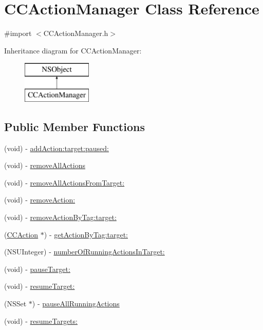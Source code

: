 \hypertarget{interface_c_c_action_manager}{\section{C\-C\-Action\-Manager Class Reference}
\label{interface_c_c_action_manager}
}


{\ttfamily \#import $<$C\-C\-Action\-Manager.\-h$>$}

Inheritance diagram for C\-C\-Action\-Manager\-:\begin{figure}[H]
\begin{center}
\leavevmode
\includegraphics[height=2.000000cm]{interface_c_c_action_manager}
\end{center}
\end{figure}
\subsection*{Public Member Functions}
\begin{DoxyCompactItemize}
\item 
(void) -\/ \hyperlink{interface_c_c_action_manager_acaa9759ef06e75a48d82e01b673f2eb4}{add\-Action\-:target\-:paused\-:}
\item 
(void) -\/ \hyperlink{interface_c_c_action_manager_a221135cfd89d31e862e2a2b8cbd3b0ff}{remove\-All\-Actions}
\item 
(void) -\/ \hyperlink{interface_c_c_action_manager_af32c4dcefa469ecece2541d0f405b517}{remove\-All\-Actions\-From\-Target\-:}
\item 
(void) -\/ \hyperlink{interface_c_c_action_manager_a6f10c668c171f7858b9202c1be97db40}{remove\-Action\-:}
\item 
(void) -\/ \hyperlink{interface_c_c_action_manager_a98c01e9ff6ad3db964d13c0daec8eb8c}{remove\-Action\-By\-Tag\-:target\-:}
\item 
(\hyperlink{interface_c_c_action}{C\-C\-Action} $\ast$) -\/ \hyperlink{interface_c_c_action_manager_afb80f2cb77931d02b00f1c53a23b717a}{get\-Action\-By\-Tag\-:target\-:}
\item 
(N\-S\-U\-Integer) -\/ \hyperlink{interface_c_c_action_manager_a4961d5047b2a1a31d8d314d75382afae}{number\-Of\-Running\-Actions\-In\-Target\-:}
\item 
(void) -\/ \hyperlink{interface_c_c_action_manager_aa98d2613d9f225a6d65cb4318022aeff}{pause\-Target\-:}
\item 
(void) -\/ \hyperlink{interface_c_c_action_manager_aa08024e5bd9c8d606dce13acb03ede6b}{resume\-Target\-:}
\item 
(N\-S\-Set $\ast$) -\/ \hyperlink{interface_c_c_action_manager_ad4c0025b0fcd31689ab77c011d842296}{pause\-All\-Running\-Actions}
\item 
(void) -\/ \hyperlink{interface_c_c_action_manager_a7e0caab635e5824f8772c72728cb9d1e}{resume\-Targets\-:}
\end{DoxyCompactItemize}
